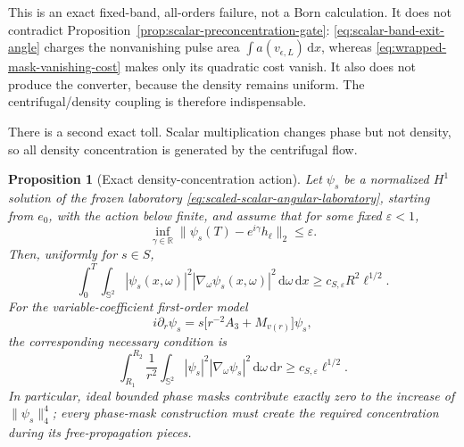 \documentclass[11pt]{article}
\newcommand{\dd}{\,\mathrm d}
\newtheorem{proposition}[theorem]{Proposition}
\theoremstyle{definition}
\theoremstyle{remark}
\begin{document}
This is an exact fixed-band, all-orders failure, not a Born calculation.  It
does not contradict Proposition~\ref{prop:scalar-preconcentration-gate}:
\eqref{eq:scalar-band-exit-angle} charges the nonvanishing pulse area
$\int a(v_{\epsilon,L})\dd x$, whereas
\eqref{eq:wrapped-mask-vanishing-cost} makes only its quadratic cost vanish.
It also does not produce the converter, because the density remains uniform.
The centrifugal/density coupling is therefore indispensable.

There is a second exact toll.  Scalar multiplication changes phase but not
density, so all density concentration is generated by the centrifugal flow.

\begin{proposition}[Exact density-concentration action]
\label{prop:density-concentration-action}
Let $\psi_s$ be a normalized $H^1$ solution of the frozen laboratory
\eqref{eq:scaled-scalar-angular-laboratory}, starting from $e_0$, with the
action below finite, and assume
that for some fixed $\varepsilon<1$,
\begin{equation}
 \inf_{\gamma\in\mathbb R}
 \|\psi_s(T)-e^{i\gamma}h_\ell\|_2\leq\varepsilon.
 \label{eq:density-action-target}
\end{equation}
Then, uniformly for $s\in S$,
\begin{equation}
 \int_0^T\int_{\mathbb S^2}
 |\psi_s(x,\omega)|^2|\nabla_\omega\psi_s(x,\omega)|^2
 \dd\omega\dd x
 \geq c_{S,\varepsilon}R^2\ell^{1/2}.
 \label{eq:density-concentration-action}
\end{equation}
For the variable-coefficient first-order model
\begin{equation}
 i\partial_r\psi_s
 =s\bigl[r^{-2}A_3+M_{v(r)}\bigr]\psi_s,
 \label{eq:variable-angular-laboratory}
\end{equation}
the corresponding necessary condition is
\begin{equation}
 \int_{R_1}^{R_2}\frac1{r^2}
 \int_{\mathbb S^2}|\psi_s|^2|\nabla_\omega\psi_s|^2
 \dd\omega\dd r
 \geq c_{S,\varepsilon}\ell^{1/2}.
 \label{eq:variable-density-concentration-action}
\end{equation}
In particular, ideal bounded phase masks contribute exactly zero to the
increase of $\|\psi_s\|_4^4$; every phase-mask construction must create the
required concentration during its free-propagation pieces.
\end{proposition}
\end{document}
